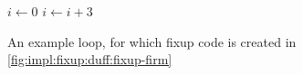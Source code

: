 \begin{figure}[H]
	\begin{algorithmic}
		\State $i \gets 0$
			\State {}
			\State $i \gets i + 3$
		\EndWhile
	\end{algorithmic}
	\caption{An example loop, for which fixup code is created in \cref{fig:impl:fixup:duff:fixup-firm}}\label{fig:impl:fixup:duff:fixup-firm-loop}
\end{figure}